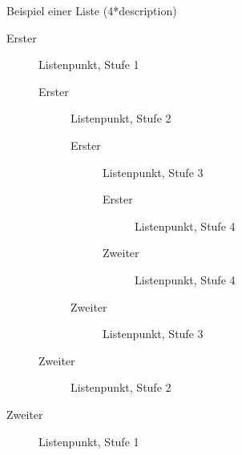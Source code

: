 \documentclass[%
,full
,color
,Ausgabe=4
]{dtk2}
\begin{document}
Beispiel einer Liste (4*description)

\begin{description}
  \item[Erster] Listenpunkt, Stufe 1
  \begin{description}
    \item[Erster] Listenpunkt, Stufe 2
    \begin{description}
      \item[Erster] Listenpunkt, Stufe 3
      \begin{description}
        \item[Erster] Listenpunkt, Stufe 4
        \item[Zweiter] Listenpunkt, Stufe 4
      \end{description}
      \item[Zweiter] Listenpunkt, Stufe 3
    \end{description}
    \item[Zweiter] Listenpunkt, Stufe 2
  \end{description}
  \item[Zweiter] Listenpunkt, Stufe 1
\end{description}
\end{document}
